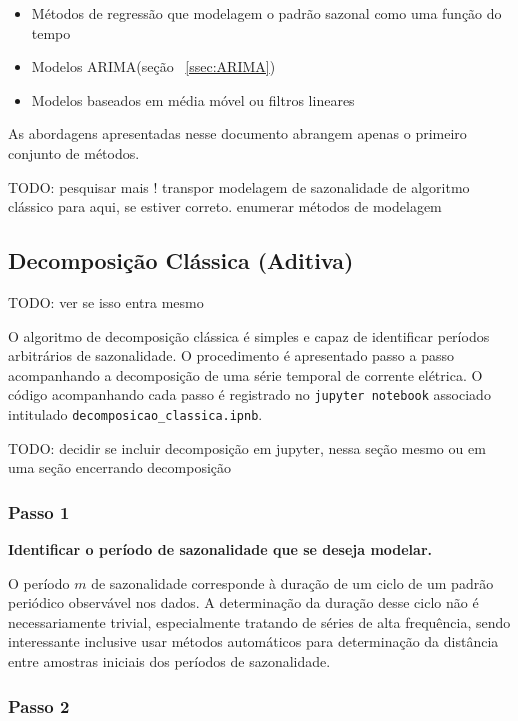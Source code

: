 \begin{itemize}
    \item Métodos de regressão que modelagem o padrão sazonal como uma função
    do tempo
    \item Modelos ARIMA(seção ~\ref{ssec:ARIMA})
    \item Modelos baseados em média móvel ou filtros lineares
\end{itemize}

As abordagens apresentadas nesse documento abrangem apenas o primeiro conjunto
de métodos.

TODO: pesquisar mais ! transpor modelagem de sazonalidade de algoritmo clássico
para aqui, se estiver correto. enumerar métodos de modelagem

\subsection{Decomposição Clássica (Aditiva)}

TODO: ver se isso entra mesmo

O algoritmo de decomposição clássica é simples e capaz de identificar períodos
arbitrários de sazonalidade. O procedimento é apresentado passo a passo
acompanhando a decomposição de uma série temporal de corrente elétrica. O
código acompanhando cada passo é registrado no \verb+jupyter notebook+
associado intitulado \verb+decomposicao_classica.ipnb+.

TODO: decidir se incluir decomposição em jupyter, nessa seção mesmo ou em uma
seção encerrando decomposição

\subsubsection{Passo 1}

\textbf{Identificar o período de sazonalidade que se deseja modelar.}

O período $m$ de sazonalidade corresponde à duração de um ciclo de um padrão
periódico observável nos dados. A determinação da duração desse ciclo não é
necessariamente trivial, especialmente tratando de séries de alta frequência,
sendo interessante inclusive usar métodos automáticos para determinação da
distância entre amostras iniciais dos períodos de sazonalidade.

\subsubsection{Passo 2}


